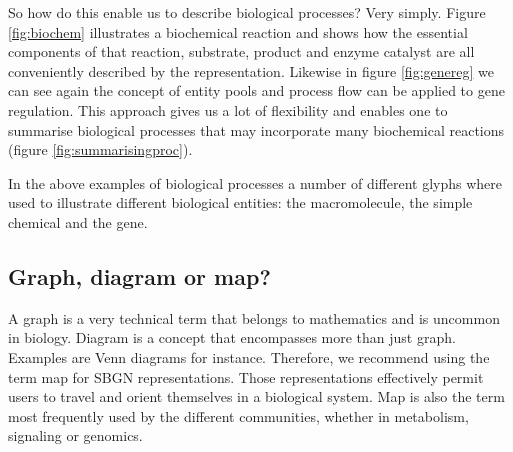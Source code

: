 So how do this enable us to describe biological processes? Very simply. Figure \ref{fig:biochem} illustrates a biochemical reaction and shows how the essential components of that reaction, substrate, product and enzyme catalyst are all conveniently described by the representation. Likewise in figure \ref{fig:genereg} we can see again the concept of entity pools and process flow can be applied to gene regulation. This approach gives us a lot of flexibility and enables one to summarise biological processes that may incorporate many biochemical reactions (figure \ref{fig:summarisingproc}).



In the above examples of biological processes a number of different glyphs where used to illustrate different biological entities: the macromolecule, the simple chemical and the gene.









\subsection{Graph, diagram or map?}

A graph is a very technical term that belongs to mathematics and is uncommon in biology. Diagram is a concept that encompasses more than just graph. Examples are Venn diagrams for instance. Therefore, we recommend using the term map for SBGN representations. Those representations effectively permit users to travel and orient themselves in a biological system. Map is also the term most frequently used by the different communities, whether in metabolism, signaling or genomics.


